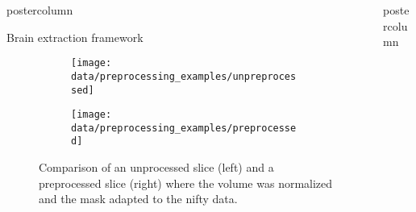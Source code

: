 \begin{frame}
\begin{columns}
\begin{column}{.42\textwidth}
\begin{beamercolorbox}[center]{postercolumn}
\begin{minipage}{.98\textwidth}
{\begin{myblock}{Brain extraction framework}
                                \begin{figure}
                                    \centering
                                    \begin{subfigure}{0.4\textwidth}
                                        \centering
                                        \texttt{[image: data/preprocessing\_examples/unpreprocessed]}
                                    \end{subfigure}
                                    \begin{subfigure}{0.4\textwidth}
                                        \centering
                                        \texttt{[image: data/preprocessing\_examples/preprocessed]}
                                    \end{subfigure}
                                    \caption{Comparison of an unprocessed slice (left) and a preprocessed slice (right) where the volume was normalized and the mask adapted to the nifty data.}
                                    \label{preprocessing_xample}
                                \end{figure}
                            \end{myblock}\vfill





                        }

                    \end{minipage}
                \end{beamercolorbox}
            \end{column}
            \begin{column}{.59\textwidth}
                \begin{beamercolorbox}[center]{postercolumn}
                    \begin{minipage}{.98\textwidth} %
                        \parbox[t][\columnheight]{\textwidth}{ %


}
\end{minipage}
\end{beamercolorbox}
\end{column}
\end{columns}
\end{frame}

